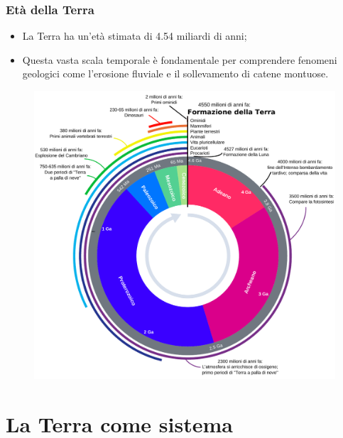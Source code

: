 \documentclass{article}
\begin{document}
\subsubsection{Età della Terra}
\begin{itemize}
    \item La Terra ha un'età stimata di 4.54 miliardi di anni;
    \item Questa vasta scala temporale è fondamentale per comprendere fenomeni geologici come
        l'erosione fluviale e il sollevamento di catene montuose.
\end{itemize}

\begin{figure}[ht!]
    \begin{center}
        \includegraphics[width=.7\textwidth]{media/geo_fisica/Geologic_Clock_with_events_and_periods_it.pdf}
    \end{center}
\end{figure}

\newpage
\section{La Terra come sistema}
\end{document}
